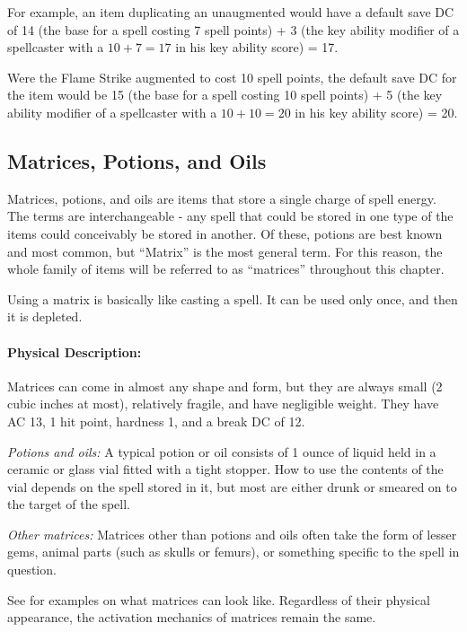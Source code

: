 For example, an item duplicating an unaugmented  would have a default save DC of 14 (the base for a spell costing 7 spell points) + 3 (the key ability modifier of a spellcaster with a $10 + 7 = 17$ in his key ability score) = 17.

Were the Flame Strike augmented to cost 10 spell points, the default save DC for the item would be 15 (the base for a spell costing 10 spell points) + 5 (the key ability modifier of a spellcaster with a $10 + 10 = 20$ in his key ability score) = 20.

\subsection{Matrices, Potions, and Oils}
\label{Item:Matrices}
Matrices, potions, and oils are items that store a single charge of spell energy.
The terms are interchangeable - any spell that could be stored in one type of the items could conceivably be stored in another.
Of these, potions are best known and most common, but ``Matrix'' is the most general term. 
For this reason, the whole family of items will be referred to as ``matrices'' throughout this chapter.

Using a matrix is basically like casting a spell.
It can be used only once, and then it is depleted.

\paragraph{Physical Description:}
Matrices can come in almost any shape and form, but they are always small (2 cubic inches at most), relatively fragile, and have negligible weight.
They have AC 13, 1 hit point, hardness 1, and a break DC of 12.
\begin{list}{}{\leftmargin=1em}
 \item \emph{Potions and oils:} A typical potion or oil consists of 1 ounce of liquid held in a ceramic or glass vial fitted with a tight stopper. How to use the contents of the vial depends on the spell stored in it, but most are either drunk or smeared on to the target of the spell.
 \item \emph{Other matrices:} Matrices other than potions and oils often take the form of lesser gems, animal parts (such as skulls or femurs), or something specific to the spell in question.
\end{list}
See  for examples on what matrices can look like.
Regardless of their physical appearance, the activation mechanics of matrices remain the same.

